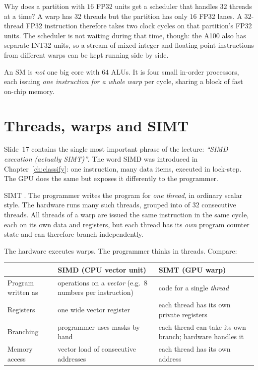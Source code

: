 \begin{intuition}
Why does a partition with $16$ FP32 units get a scheduler that handles $32$ threads at a time? A warp has $32$ threads
but the partition has only $16$ FP32 lanes. A $32$-thread FP32 instruction therefore takes two clock cycles on that
partition's FP32 units. The scheduler is not waiting during that time, though: the A100 also has separate INT32 units, so a stream
of mixed integer and floating-point instructions from different warps can be kept running side by side.
\end{intuition}

\begin{keyidea}
An SM is \emph{not} one big core with $64$ ALUs. It is four small in-order processors, each issuing
\emph{one instruction for a whole warp} per cycle, sharing a block of fast on-chip memory.
\end{keyidea}

\section{Threads, warps and SIMT}
\label{sec:simt}


Slide~17 contains the single most important phrase of the lecture: \emph{``SIMD execution (actually SIMT)''}.
The word SIMD was introduced in Chapter~\ref{ch:classify}: one instruction, many data items, executed in lock-step.
The GPU does the same but exposes it differently to the programmer.

\begin{definition}{SIMT}
. The programmer writes the program for \emph{one thread}, in ordinary scalar style.
The hardware runs many such threads, grouped into  of $32$ consecutive threads. All threads of a warp are issued the same instruction in the same cycle,
each on its own data and registers, but each thread has its \emph{own} program counter state and can therefore branch independently.
\end{definition}

The hardware executes warps. The programmer thinks in threads. Compare:
\begin{center}\small
\begin{tabular}{@{}p{3.6cm}p{5.2cm}p{5.2cm}@{}}
\toprule
 & \textbf{SIMD (CPU vector unit)} & \textbf{SIMT (GPU warp)}\\
\midrule
Program written as & operations on a \emph{vector} (e.g.\ $8$ numbers per instruction) & code for a single \emph{thread}\\
Registers & one wide vector register & each thread has its own private registers\\
Branching & programmer uses masks by hand & each thread can take its own branch; hardware handles it\\
Memory access & vector load of consecutive addresses & each thread has its own address\\
\bottomrule
\end{tabular}
\end{center}

